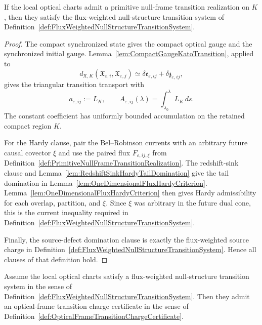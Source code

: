 \begin{theorem}\label{thm:PrimitiveRealizationGivesNullStructureSystem}
If the local optical charts admit a primitive null-frame transition realization on $K$, then they satisfy the flux-weighted null-structure transition system of Definition~\ref{def:FluxWeightedNullStructureTransitionSystem}.
\end{theorem}

\begin{proof}
The compact synchronized state gives the compact optical gauge and the synchronized initial gauge.  Lemma~\ref{lem:CompactGaugeKatoTransition}, applied to
\[
    d_{\mathfrak X,K}(\mathfrak X_{\varepsilon,i},\mathfrak X_{\varepsilon,j})
    \simeq
    \delta\mathfrak e_{\varepsilon,ij}+\delta\mathfrak z_{\varepsilon,ij},
\]
gives the triangular transition transport with
\[
    a_{\varepsilon,ij}:=L_K,
    \qquad
    A_{\varepsilon,ij}(\lambda)=\int_{\lambda_0}^{\lambda}L_K\,ds .
\]
The constant coefficient has uniformly bounded accumulation on the retained compact region $K$.

For the Hardy clause, pair the Bel--Robinson currents with an arbitrary future causal covector $\xi$ and use the paired flux $F_{\varepsilon,ij,\xi}$ from Definition~\ref{def:PrimitiveNullFrameTransitionRealization}.  The redshift-sink clause and Lemma~\ref{lem:RedshiftSinkHardyTailDomination} give the tail domination in Lemma~\ref{lem:OneDimensionalFluxHardyCriterion}.  Lemma~\ref{lem:OneDimensionalFluxHardyCriterion} then gives Hardy admissibility for each overlap, partition, and $\xi$.  Since $\xi$ was arbitrary in the future dual cone, this is the current inequality required in Definition~\ref{def:FluxWeightedNullStructureTransitionSystem}.

Finally, the source-defect domination clause is exactly the flux-weighted source charge in Definition~\ref{def:FluxWeightedNullStructureTransitionSystem}.  Hence all clauses of that definition hold.
\end{proof}

\begin{theorem}\label{thm:NullStructureTransitionProducesOpticalFrameCharge}
Assume the local optical charts satisfy a flux-weighted null-structure transition system in the sense of Definition~\ref{def:FluxWeightedNullStructureTransitionSystem}.  Then they admit an optical-frame transition charge certificate in the sense of Definition~\ref{def:OpticalFrameTransitionChargeCertificate}.
\end{theorem}

